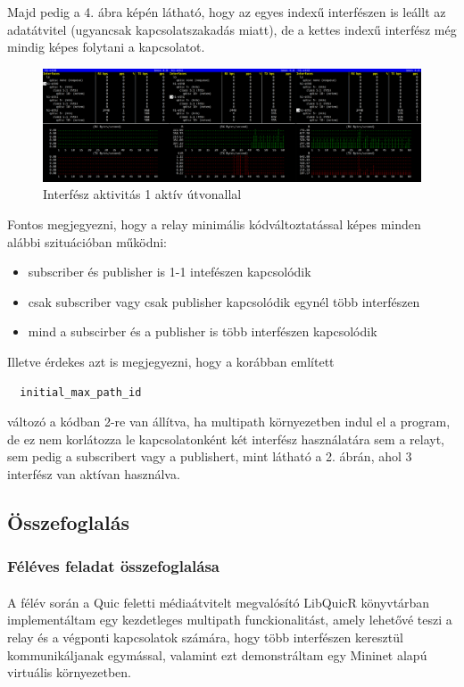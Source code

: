\documentclass[a4paper,oneside]{article}
\begin{document}
Majd pedig a 4. ábra képén látható, hogy az egyes indexű interfészen is leállt az adatátvitel (ugyancsak 
kapcsolatszakadás miatt), de a kettes indexű interfész még mindig képes folytani a kapcsolatot.

\begin{figure}[h]
  \centering
    \includegraphics[width=14cm]{bmon3}
\caption{Interfész aktivitás 1 aktív útvonallal}
\end{figure}

\pagebreak
Fontos megjegyezni, hogy a relay minimális kódváltoztatással képes minden alábbi szituációban működni:
\begin{itemize}
  \item subscriber és publisher is 1-1 intefészen kapcsolódik
  \item csak subscriber vagy csak publisher kapcsolódik egynél több interfészen
  \item mind a subscirber és a publisher is több interfészen kapcsolódik
\end{itemize}

Illetve érdekes azt is megjegyezni, hogy a korábban említett 
\begin{verbatim}
  initial_max_path_id
\end{verbatim}
változó a kódban 2-re van állítva, ha multipath környezetben indul el a program,
de ez nem korlátozza le kapcsolatonként két interfész használatára sem a relayt, sem pedig a 
subscribert vagy a publishert, mint látható a 2. ábrán, ahol 3 interfész van aktívan használva.

\subsection{Összefoglalás}
\label{sec:osszefoglalas}

\subsubsection{Féléves feladat összefoglalása}
\paragraph{}
A félév során a Quic feletti médiaátvitelt megvalósító LibQuicR könyvtárban implementáltam 
egy kezdetleges multipath funckionalitást, amely lehetővé teszi a relay és a végponti 
kapcsolatok számára, hogy több interfészen keresztül kommunikáljanak egymással, valamint ezt demonstráltam egy Mininet alapú 
virtuális környezetben.
\end{document}
